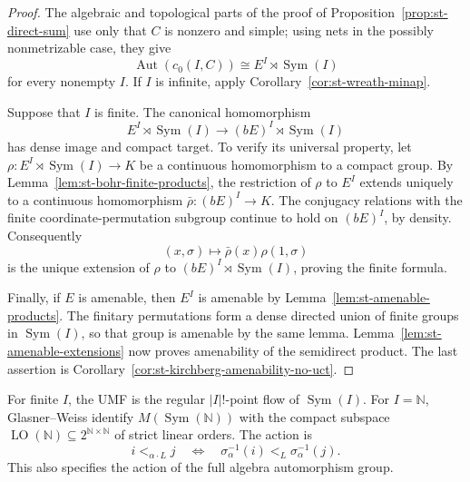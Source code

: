 \begin{proof}
The algebraic and topological parts of the proof of Proposition~\ref{prop:st-direct-sum} use only that $C$ is nonzero and simple; using nets in the
possibly nonmetrizable case, they give 
\begin{equation*}
\operatorname{Aut}(c_0(I,C))\cong E^I\rtimes\operatorname{Sym}(I) 
\end{equation*}
for every nonempty $I$. If $I$ is infinite, apply Corollary~\ref{cor:st-wreath-minap}.

Suppose that $I$ is finite. The canonical homomorphism 
\begin{equation*}
E^I\rtimes\operatorname{Sym}(I)\longrightarrow(bE)^I\rtimes\operatorname{Sym}(I) 
\end{equation*}
has dense image and compact target. To verify its universal property, let $\rho:E^I\rtimes\operatorname{Sym}(I)\to K$ be a continuous homomorphism to a compact
group. By Lemma~\ref{lem:st-bohr-finite-products}, the restriction of $\rho$ to 
$E^I$ extends uniquely to a continuous homomorphism $\bar\rho:(bE)^I\to K$.
The conjugacy relations with the finite coordinate-permutation subgroup
continue to hold on $(bE)^I$, by density. Consequently 
\begin{equation*}
(x,\sigma)\longmapsto  \bar\rho(x)\rho(1,\sigma) 
\end{equation*}
is the unique extension of $\rho$ to $(bE)^I\rtimes\operatorname{Sym}(I)$, proving the
finite formula.

Finally, if $E$ is amenable, then $E^I$ is amenable by Lemma~\ref{lem:st-amenable-products}. The finitary permutations form a dense directed
union of finite groups in $\operatorname{Sym}(I)$, so that group is amenable by the same
lemma. Lemma~\ref{lem:st-amenable-extensions} now proves amenability of the
semidirect product. The last assertion is Corollary~\ref{cor:st-kirchberg-amenability-no-uct}.
\end{proof}

For finite $I$, the UMF is the regular $|I|!$-point flow of $\operatorname{Sym}(I)$. For $I=\mathbb{N}$, Glasner--Weiss \cite{GlasnerWeiss2002,Glasner2002Orders} identify $M(\operatorname{Sym}(\mathbb{N}))$ with the compact subspace $\operatorname{LO}(\mathbb{N})\subseteq2^{\mathbb{N}\times\mathbb{N}}$ of strict linear orders. The action is 
\begin{equation*}
i<_{\alpha\cdot L}j  \quad\Longleftrightarrow\quad 
\sigma_\alpha^{-1}(i)<_L\sigma_\alpha^{-1}(j). 
\end{equation*}
This also specifies the action of the full algebra automorphism group.

